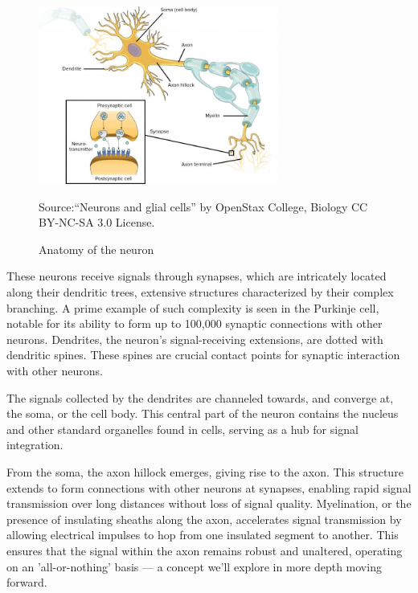 \documentclass[12pt,a4paper]{report}
\begin{document}
\begin{figure}[H]
    \centering
    \includegraphics[width=0.7\textwidth]{./data/neural.jpg}
    \caption{Anatomy of the neuron}
    \label{fig:my_picture}
    \vspace{1pt} %
    \small{Source:“Neurons and glial cells” by OpenStax College, Biology CC BY-NC-SA 3.0 License.}
\end{figure}

These neurons receive signals through synapses, which are intricately located along their dendritic trees, extensive structures characterized by their complex branching. A prime example of such complexity is seen in the Purkinje cell, notable for its ability to form up to 100,000 synaptic connections with other neurons. Dendrites, the neuron's signal-receiving extensions, are dotted with dendritic spines. These spines are crucial contact points for synaptic interaction with other neurons.

The signals collected by the dendrites are channeled towards, and converge at, the soma, or the cell body. This central part of the neuron contains the nucleus and other standard organelles found in cells, serving as a hub for signal integration.

From the soma, the axon hillock emerges, giving rise to the axon. This structure extends to form connections with other neurons at synapses, enabling rapid signal transmission over long distances without loss of signal quality. Myelination, or the presence of insulating sheaths along the axon, accelerates signal transmission by allowing electrical impulses to hop from one insulated segment to another. This ensures that the signal within the axon remains robust and unaltered, operating on an 'all-or-nothing' basis — a concept we'll explore in more depth moving forward.
\end{document}
